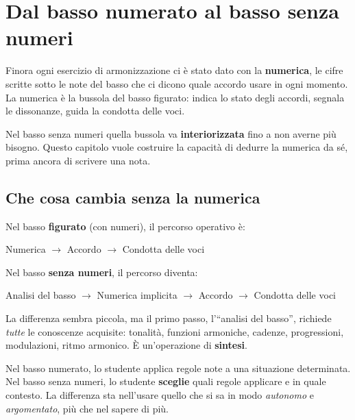 \chapter{Dal basso numerato al basso senza numeri}
\label{chap:dal_numerato_al_senza_numeri}

Finora ogni esercizio di armonizzazione ci è stato dato con la \textbf{numerica}, le cifre scritte sotto le note del basso che ci dicono quale accordo usare in ogni momento. La numerica è la bussola del basso figurato: indica lo stato degli accordi, segnala le dissonanze, guida la condotta delle voci.

Nel basso senza numeri quella bussola va \textbf{interiorizzata} fino a non averne più bisogno. Questo capitolo vuole costruire la capacità di dedurre la numerica da sé, prima ancora di scrivere una nota.

\section{Che cosa cambia senza la numerica}
\label{sec:cosa_cambia}

Nel basso \textbf{figurato} (con numeri), il percorso operativo è:
\begin{center}
	Numerica $\rightarrow$ Accordo $\rightarrow$ Condotta delle voci
\end{center}

Nel basso \textbf{senza numeri}, il percorso diventa:
\begin{center}
	Analisi del basso $\rightarrow$ Numerica implicita $\rightarrow$ Accordo $\rightarrow$ Condotta delle voci
\end{center}

La differenza sembra piccola, ma il primo passo, l'``analisi del basso'', richiede \textit{tutte} le conoscenze acquisite: tonalità, funzioni armoniche, cadenze, progressioni, modulazioni, ritmo armonico. È un'operazione di \textbf{sintesi}.

\begin{osservazione}
	\label{oss:scelta_responsabile}
	Nel basso numerato, lo studente applica regole note a una situazione determinata. Nel basso senza numeri, lo studente \textbf{sceglie} quali regole applicare e in quale contesto. La differenza sta nell'usare quello che si sa in modo \textit{autonomo} e \textit{argomentato}, più che nel sapere di più.
\end{osservazione}

